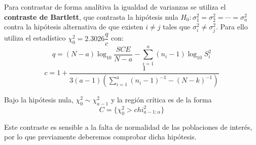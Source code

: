 Para contrastar de forma anal\'itiva la igualdad de varianzas se utiliza el \textbf{contraste de Bartlett}, que contrasta la hip\'otesis nula $H_0:\sigma_1^2=\sigma_2^2=\cdots=\sigma_a^2$ contra la hip\'otesis alternativa de que existen $i\neq j$ tales que $\sigma_i^2\neq\sigma_j^2$. Para ello utiliza el estad\'istico $\chi^2_0=2.3026\dfrac{q}{c}$ con:
\[q=(N-a)\log_{10}{\dfrac{SCE}{N-a}}-\sum_{i=1}^a(n_i-1)\log_{10}{S_i^2}\]
\[c=1+\dfrac{1}{3(a-1)\left(\sum_{i=1}^a(n_i-1)^{-1}-(N-k)^{-1}\right)}\]

Bajo la hip\'otesis nula, $\chi^2_0\sim\chi^2_{a-1}$ y la regi\'on cr\'itica es de la forma
\[C=\{\chi^2_0>chi^2_{a-1;\alpha}\}\]

Este contraste es sensible a la falta de normalidad de las poblaciones de inter\'es, por lo que previamente deberemos comprobar dicha hip\'otesis.



